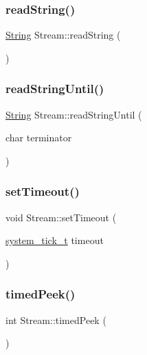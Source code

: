 \mbox{\label{class_stream_a1c60bdda2b65d78e5a1362d51b856c5a}} 
\subsubsection{\texorpdfstring{read\+String()}{readString()}}
{\footnotesize\ttfamily \hyperlink{class_string}{String} Stream\+::read\+String (\begin{DoxyParamCaption}{ }\end{DoxyParamCaption})}

\mbox{\label{class_stream_a6a409da87c552909260d8cc428c5ca70}} 
\subsubsection{\texorpdfstring{read\+String\+Until()}{readStringUntil()}}
{\footnotesize\ttfamily \hyperlink{class_string}{String} Stream\+::read\+String\+Until (\begin{DoxyParamCaption}\item[{char}]{terminator }\end{DoxyParamCaption})}

\mbox{\label{class_stream_abaa50647d6dbb3baf7697a2691a06177}} 
\subsubsection{\texorpdfstring{set\+Timeout()}{setTimeout()}}
{\footnotesize\ttfamily void Stream\+::set\+Timeout (\begin{DoxyParamCaption}\item[{\hyperlink{system__tick__hal_8h_a272b267acff35fc07ab6b6011843dd6c}{system\+\_\+tick\+\_\+t}}]{timeout }\end{DoxyParamCaption})}

\mbox{\label{class_stream_ae326bf60a3c5276836526710871046fe}} 
\subsubsection{\texorpdfstring{timed\+Peek()}{timedPeek()}}
{\footnotesize\ttfamily int Stream\+::timed\+Peek (\begin{DoxyParamCaption}{ }\end{DoxyParamCaption})\hspace{0.3cm}{\ttfamily [protected]}}

